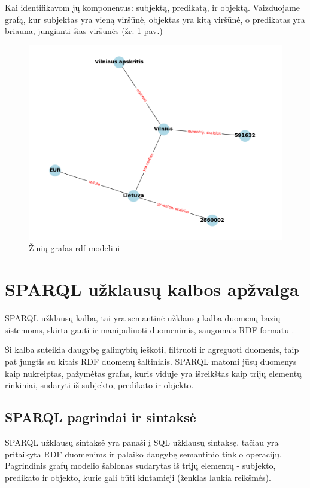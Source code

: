 \documentclass{VUMIFPSkursinis}
\begin{document}
Kai identifikavom jų komponentus: subjektą, predikatą, ir objektą. Vaizduojame grafą, kur subjektas yra vieną viršūnė, objektas yra kitą viršūnė, o predikatas yra briauna, jungianti šias viršūnės (žr. \ref{fig:rdf_example} pav.)
\begin{figure}[htbp]
  \centering
  \includegraphics[width=1\textwidth]{img/rdf_example.png}
  \caption{Žinių grafas rdf modeliui}
  \label{fig:rdf_example}
\end{figure}
\pagebreak

\section{SPARQL užklausų kalbos apžvalga}
SPARQL užklausų kalba, tai yra semantinė užklausų kalba duomenų bazių sistemoms, skirta gauti ir manipuliuoti duomenimis, saugomais RDF formatu \cite{wiki:sparql}.

Ši kalba suteikia daugybę galimybių ieškoti, filtruoti ir agreguoti duomenis, taip pat jungtis su kitais RDF duomenų šaltiniais. SPARQL matomi jūsų duomenys kaip nukreiptas, pažymėtas grafas, kuris viduje yra išreikštas kaip trijų elementų rinkiniai, sudaryti iš subjekto, predikato ir objekto.

\subsection{SPARQL pagrindai ir sintaksė}
SPARQL užklausų sintaksė yra panaši į SQL užklausų sintaksę, tačiau yra pritaikyta RDF duomenims ir palaiko daugybę semantinio tinklo operacijų. Pagrindinis grafų modelio šablonas sudarytas iš trijų elementų - subjekto, predikato ir objekto, kurie gali būti kintamieji (ženklas laukia reikšmės).
\end{document}
